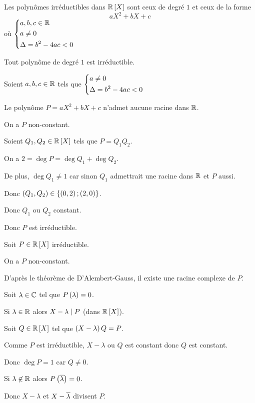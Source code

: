 \begin{theo}
Les polynômes irréductibles dans \(\poly[\R]\) sont ceux de degré \(1\) et ceux de la forme \[aX^2+bX+c\] où \(\begin{dcases}a,b,c\in\mathbb{R} \\ a\not=0 \\ \Delta=b^2-4ac<0\end{dcases}\)
\end{theo}

\begin{dem}
\increc

Tout polynôme de degré \(1\) est irréductible.

Soient \(a,b,c\in\mathbb{R}\) tels que \(\begin{dcases}a\not=0 \\ \Delta=b^2-4ac<0\end{dcases}\)

Le polynôme \(P=aX^2+bX+c\) n'admet aucune racine dans \(\mathbb{R}\).

On a \(P\) non-constant.

Soient \(Q_1,Q_2\in\poly[\R]\) tels que \(P=Q_1Q_2\).

On a \(2=\deg P=\deg Q_1+\deg Q_2\).

De plus, \(\deg Q_1\not=1\) car sinon \(Q_1\) admettrait une racine dans \(\mathbb{R}\) et \(P\) aussi.

Donc \(\left(Q_1,Q_2\right)\in\left\lbrace\left(0,2\right);\left(2,0\right)\right\rbrace\).

Donc \(Q_1\) ou \(Q_2\) constant.

Donc \(P\) est irréductible.

\incdir

Soit \(P\in\poly[\R]\) irréductible.

On a \(P\) non-constant.

D'après le théorème de D'Alembert-Gauss, il existe une racine complexe de \(P\).

Soit \(\lambda\in\mathbb{C}\) tel que \(P\left(\lambda\right)=0\).

Si \(\lambda\in\mathbb{R}\) alors \(X-\lambda\mid P\) (dans \(\poly[\R]\)).

Soit \(Q\in\poly[\R]\) tel que \(\left(X-\lambda\right)Q=P\).

Comme \(P\) est irréductible, \(X-\lambda\) ou \(Q\) est constant donc \(Q\) est constant.

Donc \(\deg P=1\) car \(Q\not=0\).

Si \(\lambda\not\in\mathbb{R}\) alors \(P\left(\overline{\lambda}\right)=0\).

Donc \(X-\lambda\) et \(X-\overline{\lambda}\) divisent \(P\).


\end{dem}
